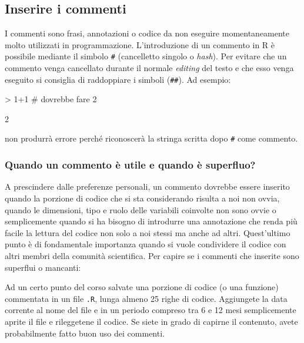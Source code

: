 \documentclass[onecolumn,11pt]{book}
\begin{document}
\subsection*{Inserire i commenti}  
I commenti sono frasi, annotazioni o codice da non eseguire momentaneamente molto utilizzati in programmazione. L'introduzione di un commento in \textsf{R} \`e possibile mediante il simbolo \texttt{\#} (cancelletto singolo o \emph{hash}). Per evitare che un commento venga cancellato durante il normale \textit{editing} del testo e che esso venga eseguito si consiglia di raddoppiare i simboli (\texttt{\#\#}). Ad esempio:
\index{\texttt{\#}} 
\begin{Schunk}
\begin{Sinput}
> 1+1 # dovrebbe fare 2
\end{Sinput}
\begin{Soutput}
[1] 2
\end{Soutput}
\end{Schunk}
non produrr\`a errore perch\'e riconoscer\`a la stringa scritta dopo \texttt{\#} come commento.

\subsubsection{Quando un commento \`e utile e quando \`e superfluo?}
A prescindere dalle preferenze personali, un commento dovrebbe essere inserito quando la porzione di codice che si sta considerando risulta a noi non ovvia, quando le dimensioni, tipo e ruolo delle variabili coinvolte non sono ovvie o semplicemente quando si ha bisogno di introdurre una annotazione che renda pi\`u facile la lettura del codice non solo a noi stessi ma anche ad altri. Quest'ultimo punto \`e di fondamentale importanza quando si vuole condividere il codice con altri membri della comunit\`a scientifica. Per capire se i commenti che inserite sono superflui o mancanti:
\begin{shaded}
Ad un certo punto del corso salvate una porzione di codice (o una funzione) commentata in un file \texttt{.R}, lunga almeno 25 righe di codice. Aggiungete la data corrente al nome del file e in un periodo compreso tra 6 e 12 mesi semplicemente aprite il file e rileggetene il codice. Se siete in grado di capirne il contenuto, avete probabilmente fatto buon uso dei commenti.
 \end{shaded} 
\end{document}
